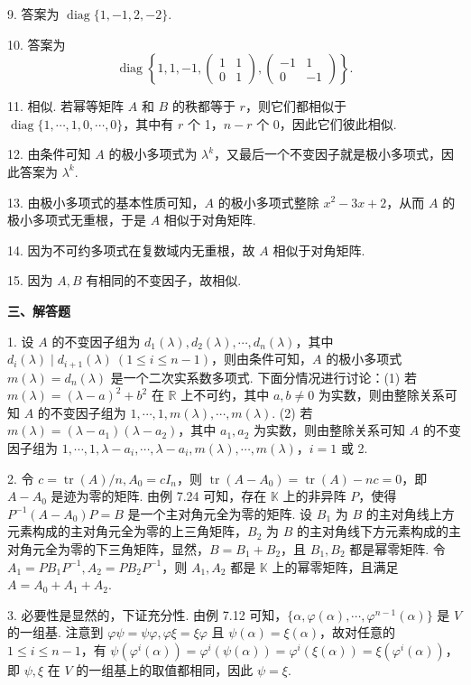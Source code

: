 \documentclass[UTF8,12pt,a4paper,fontset=fandol]{ctexart}
\begin{document}
9. 答案为 $\operatorname{diag}\{1,-1,2,-2\}$.

10. 答案为
\[
\operatorname{diag}\left\{1,1,-1,\left(\begin{array}{cc}1&1\\0&1\end{array}\right),\left(\begin{array}{cc}-1&1\\0&-1\end{array}\right)\right\}.
\]

11. 相似. 若幂等矩阵 $A$ 和 $B$ 的秩都等于 $r$，则它们都相似于 $\operatorname{diag}\{1,\cdots,1,0,\cdots,0\}$，其中有 $r$ 个 1，$n-r$ 个 0，因此它们彼此相似.

12. 由条件可知 $A$ 的极小多项式为 $\lambda^k$，又最后一个不变因子就是极小多项式，因此答案为 $\lambda^k$.

13. 由极小多项式的基本性质可知，$A$ 的极小多项式整除 $x^2-3x+2$，从而 $A$ 的极小多项式无重根，于是 $A$ 相似于对角矩阵.

14. 因为不可约多项式在复数域内无重根，故 $A$ 相似于对角矩阵.

15. 因为 $A,B$ 有相同的不变因子，故相似.

\noindent\textbf{三、解答题}

1. 设 $A$ 的不变因子组为 $d_1(\lambda),d_2(\lambda),\cdots,d_n(\lambda)$，其中 $d_i(\lambda)\mid d_{i+1}(\lambda)\ (1\le i\le n-1)$，则由条件可知，$A$ 的极小多项式 $m(\lambda)=d_n(\lambda)$ 是一个二次实系数多项式. 下面分情况进行讨论：(1) 若 $m(\lambda)=(\lambda-a)^2+b^2$ 在 $\mathbb{R}$ 上不可约，其中 $a,b\ne0$ 为实数，则由整除关系可知 $A$ 的不变因子组为 $1,\cdots,1,m(\lambda),\cdots,m(\lambda)$. (2) 若 $m(\lambda)=(\lambda-a_1)(\lambda-a_2)$，其中 $a_1,a_2$ 为实数，则由整除关系可知 $A$ 的不变因子组为 $1,\cdots,1,\lambda-a_i,\cdots,\lambda-a_i,m(\lambda),\cdots,m(\lambda)$，$i=1$ 或 2.

2. 令 $c=\operatorname{tr}(A)/n,A_0=cI_n$，则 $\operatorname{tr}(A-A_0)=\operatorname{tr}(A)-nc=0$，即 $A-A_0$ 是迹为零的矩阵. 由例 7.24 可知，存在 $\mathbb{K}$ 上的非异阵 $P$，使得 $P^{-1}(A-A_0)P=B$ 是一个主对角元全为零的矩阵. 设 $B_1$ 为 $B$ 的主对角线上方元素构成的主对角元全为零的上三角矩阵，$B_2$ 为 $B$ 的主对角线下方元素构成的主对角元全为零的下三角矩阵，显然，$B=B_1+B_2$，且 $B_1,B_2$ 都是幂零矩阵. 令 $A_1=PB_1P^{-1},A_2=PB_2P^{-1}$，则 $A_1,A_2$ 都是 $\mathbb{K}$ 上的幂零矩阵，且满足 $A=A_0+A_1+A_2$.

3. 必要性是显然的，下证充分性. 由例 7.12 可知，$\{\alpha,\varphi(\alpha),\cdots,\varphi^{n-1}(\alpha)\}$ 是 $V$ 的一组基. 注意到 $\varphi\psi=\psi\varphi,\varphi\xi=\xi\varphi$ 且 $\psi(\alpha)=\xi(\alpha)$，故对任意的 $1\le i\le n-1$，有 $\psi(\varphi^i(\alpha))=\varphi^i(\psi(\alpha))=\varphi^i(\xi(\alpha))=\xi(\varphi^i(\alpha))$，即 $\psi,\xi$ 在 $V$ 的一组基上的取值都相同，因此 $\psi=\xi$.
\end{document}
